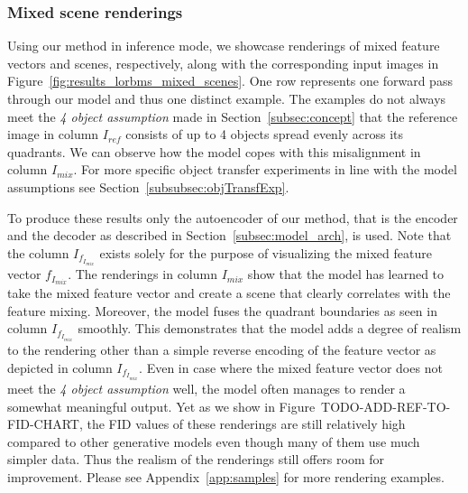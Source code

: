 \documentclass[12pt,a4paper]{article}
\begin{document}
\subsubsection{Mixed scene renderings}
Using our method in inference mode, we showcase renderings of mixed feature vectors and scenes, respectively, along with the corresponding input images in Figure~\ref{fig:results_lorbms_mixed_scenes}. One row represents one forward pass through our model and thus one distinct example. The examples do not always meet the \textit{4 object assumption} made in Section~\ref{subsec:concept} that the reference image in column $I_{ref}$ consists of up to 4 objects spread evenly across its quadrants. We can observe how the model copes with this misalignment in column $I_{mix}$. For more specific object transfer experiments in line with the model assumptions see Section~\ref{subsubsec:objTransfExp}. 

To produce these results only the autoencoder of our method, that is the encoder and the decoder as described in Section~\ref{subsec:model_arch}, is used. Note that the column $I_{f_{I_{mix}}}$ exists solely for the purpose of visualizing the mixed feature vector $f_{I_{mix}}$. The renderings in column $I_{mix}$ show that the model has learned to take the mixed feature vector and create a scene that clearly correlates with the feature mixing. Moreover, the model fuses the quadrant boundaries as seen in column $I_{f_{I_{mix}}}$ smoothly. This demonstrates that the model adds a degree of realism to the rendering other than a simple reverse encoding of the feature vector as depicted in column $I_{f_{I_{mix}}}$. Even in case where the mixed feature vector does not meet the \textit{4 object assumption} well, the model often manages to render a somewhat meaningful output. Yet as we show in Figure~TODO-ADD-REF-TO-FID-CHART, the FID values of these renderings are still relatively high compared to other generative models even though many of them use much simpler data. Thus the realism of the renderings still offers room for improvement.
Please see Appendix~\ref{app:samples} for more rendering examples.
\end{document}
